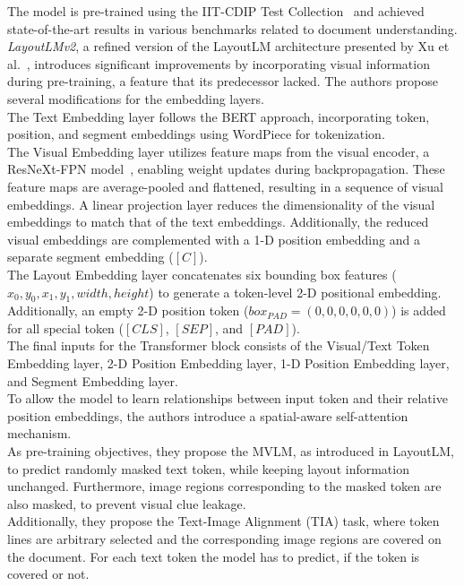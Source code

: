 The model is pre-trained using the IIT-CDIP Test Collection~\cite{lewis2006building} and achieved state-of-the-art results in various benchmarks related to document understanding.\newpage
\textit{LayoutLMv2}, a refined version of the LayoutLM architecture presented by Xu et al.~\cite{xu2020layoutlmv2}, introduces significant improvements by incorporating visual information during pre-training, a feature that its predecessor lacked. The authors propose several modifications for the embedding layers.\\
The Text Embedding layer follows the BERT approach, incorporating token, position, and segment embeddings using WordPiece for tokenization.\\
The Visual Embedding layer utilizes feature maps from the visual encoder, a ResNeXt-FPN model~\cite{xie2017aggregated}, enabling weight updates during backpropagation. These feature maps are average-pooled and flattened, resulting in a sequence of visual embeddings. A linear projection layer reduces the dimensionality of the visual embeddings to match that of the text embeddings. Additionally, the reduced visual embeddings are complemented with a  1-D position embedding and a separate segment embedding ($[C]$).\\
The Layout Embedding layer concatenates six bounding box features ($x_0, y_0,\allowbreak x_1, y_1,\allowbreak width, height$) to generate a token-level 2-D positional embedding. Additionally, an empty 2-D position token ($box_{PAD} = (0,0,0,0,0,0)$) is added for all special token ($[CLS]$, $[SEP]$, and $[PAD]$).\\
The final inputs for the Transformer block consists of the Visual/Text Token Embedding layer, 2-D Position Embedding layer, 1-D Position Embedding layer, and Segment Embedding layer.\\
To allow the model to learn relationships between input token and their relative position embeddings, the authors introduce a spatial-aware self-attention mechanism.\\
As pre-training objectives, they propose the MVLM, as introduced in LayoutLM, to predict randomly masked text token, while keeping layout information unchanged. Furthermore, image regions corresponding to the masked token are also masked, to prevent visual clue leakage.\\
Additionally, they propose the Text-Image Alignment (TIA) task, where token lines are arbitrary selected and the corresponding image regions are covered on the document. For each text token the model has to predict, if the token is covered or not.\\
